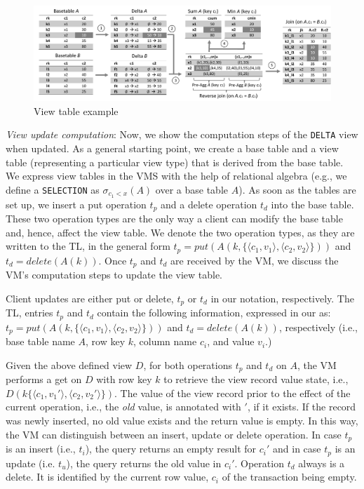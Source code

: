 \begin{figure}
  \includegraphics[width=\linewidth]{figures/ViewCalculationExample}
      \vspace{-7mm}
  \caption{View table example}\label{fig:view_table_example}
        \vspace{-5mm}
\endminipage\hfill
\end{figure}

\noindent  
\textit{View update computation}: Now, we show the computation steps of 
the \texttt{DELTA} view when updated. As a general starting point, we 
create a base table and a view table (representing a particular view 
type) that is derived from the base table. We express view tables in the 
VMS with the help of relational algebra (e.g., we define a 
\texttt{SELECTION} as $\sigma_{c_1 < x}(A)$ over a base table $A$). As 
soon as the tables are set up, we insert a put operation $t_p$ and a 
delete operation $t_d$ into the base table. These two operation types 
are the only way a client can modify the base table and, hence, affect 
the view table. We denote the two operation types, as they are written 
to the TL, in the general form $t_p=put(A(k,\{\langle c_1, v_1\rangle, 
\langle c_2,v_2\rangle\}))$ and $t_d=delete( A(k))$. Once $t_p$ and 
$t_d$ are received by the VM, we discuss the VM's computation steps to 
update the view table. 

Client updates are either put or delete, $t_p$ or $t_d$ in our notation, 
respectively. The TL, entries $t_p$ and $t_d$ contain the following 
information, expressed in our as: $t_p=put(A(k,\{\langle c_1, 
v_1\rangle,\allowbreak \langle c_2,v_2\rangle\}))$ and $t_d=delete( 
A(k))$, respectively (i.e., base table name $A$, row key $k$, column 
name $c_i$, and value $v_i$.) 


Given the above defined view $D$, for both operations $t_p$ and $t_d$
on $A$, the VM performs a get on $D$ with row key $k$ to retrieve the
view record value state, i.e., $D(k\{ \langle c_1,v_1'\rangle, \langle
c_2,v_2'\rangle\})$. The value of the view record prior to the effect
of the current operation, i.e., the \textit{old} value, is annotated
with $'$, if it exists. If the record was newly inserted, no old value
exists and the return value is empty.  In this way, the VM can
distinguish between an insert, update or delete operation.  In case
$t_p$ is an insert (i.e., $t_i$), the query returns an empty result
for $c_i'$ and in case $t_p$ is an update (i.e. $t_u$), the query
returns the old value in $c_i'$.  Operation $t_d$ always is a
delete. It is identified by the current row value, $c_i$ of the transaction
being empty.

